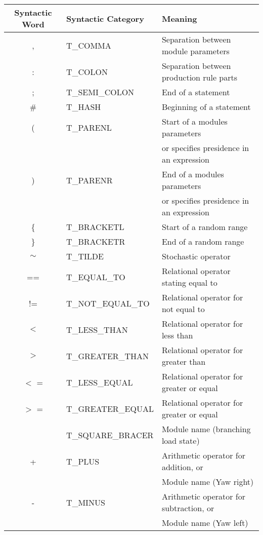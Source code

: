 \begin{flushleft}
\begin{table}[h!] \center
\begin{tabular}{ | c | l | l |}
\hline
	Syntactic Word	& Syntactic Category & Meaning\\  
\hline
\hline
	, 				& T\_COMMA 				& Separation between module parameters \\
\hline
	: 				& T\_COLON 				& Separation between production rule parts \\
\hline
	; 				& T\_SEMI\_COLON 		& End of a statement\\
\hline
	\#				& T\_HASH 				& Beginning of a statement\\
\hline
	( 				& T\_PARENL 			& Start of a modules parameters \\
					&						& or specifies presidence in an expression \\
\hline
	) 				& T\_PARENR 			& End of a modules parameters \\
					&						& or specifies presidence in an expression \\
\hline 
	\{ 				& T\_BRACKETL 			& Start of a random range\\
\hline
	\} 				& T\_BRACKETR 			& End of a random range\\
\hline
	$\sim$ 			& T\_TILDE 				& Stochastic operator\\
\hline
	== 				& T\_EQUAL\_TO 			& Relational operator stating equal to\\
\hline
	!= 				& T\_NOT\_EQUAL\_TO 	& Relational operator for not equal to\\
\hline		
	$<$ 			& T\_LESS\_THAN 		& Relational operator for less than\\
\hline
	$>$ 			& T\_GREATER\_THAN 		& Relational operator for greater than\\
\hline
	$<$ = 			& T\_LESS\_EQUAL 		& Relational operator for greater or equal\\
\hline
	$>$ = 			& T\_GREATER\_EQUAL 	& Relational operator for greater or equal\\
\hline
	[ 				& T\_SQUARE\_BRACEL 	& Module name (branching save state) \\
\hline
	] 				& T\_SQUARE\_BRACER 	& Module name (branching load state) \\
\hline
	+ 				& T\_PLUS 				& Arithmetic operator for addition, or\\
					&						& Module name (Yaw right) \\
\hline
	- 				& T\_MINUS 				& Arithmetic operator for subtraction, or\\
					&						& Module name (Yaw left)\\

\end{tabular}
\end{table}
\end{flushleft}
